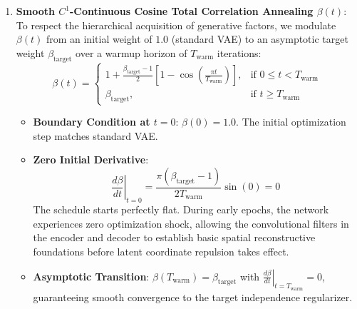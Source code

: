 \documentclass[11pt,a4paper]{article}
\begin{document}
\begin{enumerate}
    \item \textbf{Smooth $C^1$-Continuous Cosine Total Correlation Annealing $\beta(t)$}:
    To respect the hierarchical acquisition of generative factors, we modulate $\beta(t)$ from an initial weight of $1.0$ (standard VAE) to an asymptotic target weight $\beta_{\text{target}}$ over a warmup horizon of $T_{\text{warm}}$ iterations:
    \begin{equation}
    \beta(t) = \begin{cases} 1 + \frac{\beta_{\text{target}} - 1}{2} \left[ 1 - \cos\left( \frac{\pi t}{T_{\text{warm}}} \right) \right], & \text{if } 0 \le t < T_{\text{warm}} \\ \beta_{\text{target}}, & \text{if } t \ge T_{\text{warm}} \end{cases}
    \label{eq:cosine_schedule}
    \end{equation}
    \begin{itemize}
        \item \textbf{Boundary Condition at $t = 0$}: $\beta(0) = 1.0$. The initial optimization step matches standard VAE.
        \item \textbf{Zero Initial Derivative}:
        \begin{equation}
        \left.\frac{d\beta}{dt}\right|_{t=0} = \frac{\pi(\beta_{\text{target}} - 1)}{2 T_{\text{warm}}} \sin(0) = 0
        \end{equation}
        The schedule starts perfectly flat. During early epochs, the network experiences zero optimization shock, allowing the convolutional filters in the encoder and decoder to establish basic spatial reconstructive foundations before latent coordinate repulsion takes effect.
        \item \textbf{Asymptotic Transition}: $\beta(T_{\text{warm}}) = \beta_{\text{target}}$ with $\left.\frac{d\beta}{dt}\right|_{t=T_{\text{warm}}} = 0$, guaranteeing smooth convergence to the target independence regularizer.
    \end{itemize}


\end{enumerate}
\end{document}
